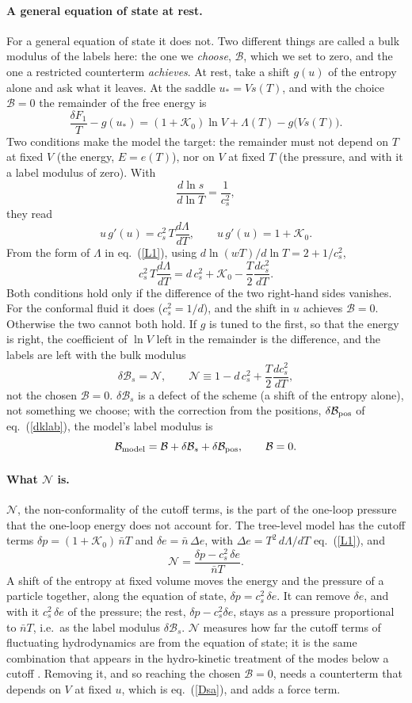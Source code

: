\documentclass[11pt,aps,preprint,nofootinbib,superscriptaddress,tightenlines]{revtex4-2}
\newcommand{\klab}{\mathcal B}
\def\st{\begin{equation}}
\def\stp{\end{equation}}
\def\Eq#1{eq.~(\ref{#1})}
\let\oldparagraph\paragraph
\renewcommand{\paragraph}{\par\bigskip\oldparagraph}
\begin{document}
\paragraph{A general equation of state at rest.}  For a general equation of state it does not.  Two different things are called a bulk modulus of the labels here:
the one we \emph{choose}, $\klab$, which we set to zero, and the one a restricted counterterm \emph{achieves}.  At rest, take a shift $g(u)$ of the entropy alone and ask
what it leaves.  At the saddle $u_*=V s(T)$, and with the choice $\klab=0$ the remainder of the free energy is
\st
\frac{\delta F_1}T-g(u_*)=(1+\mathcal K_0)\ln V+\Lambda(T)-g\big(Vs(T)\big) .
\stp
Two conditions make the model the target: the remainder must not depend on $T$ at fixed $V$ (the energy, $E=e(T)$), nor on $V$ at fixed $T$ (the pressure, and with it
a label modulus of zero).  With
\st
\frac{d\ln s}{d\ln T}=\frac1{c_s^2},
\stp
they read
\st
u\,g'(u)=c_s^2\,T\frac{d\Lambda}{dT},\qquad u\,g'(u)=1+\mathcal K_0 .
\stp
From the form of $\Lambda$ in \Eq{L1}, using $d\ln(wT)/d\ln T=2+1/c_s^2$,
\st
c_s^2\,T\frac{d\Lambda}{dT}=d\,c_s^2+\mathcal K_0-\frac T2\frac{dc_s^2}{dT} .
\stp
Both conditions hold only if the difference of the two right-hand sides vanishes.  For the conformal fluid it does ($c_s^2=1/d$), and the shift in $u$ achieves
$\klab=0$.  Otherwise the two cannot both hold.  If $g$ is tuned to the first, so that the energy is right, the coefficient of $\ln V$ left in the remainder is the
difference, and the labels are left with the bulk modulus
\st
\delta\klab_s=\mathcal N,\qquad \mathcal N\equiv1-d\,c_s^2+\frac T2\frac{dc_s^2}{dT} ,
\label{amtbracket}
\stp
not the chosen $\klab=0$.  $\delta\klab_s$ is a defect of the scheme (a shift of the entropy alone), not something we choose; with the correction from the positions,
$\delta\klab_{\rm pos}$ of \Eq{dklab}, the model's label modulus is
\st
\klab_{\rm model}=\klab+\delta\klab_s+\delta\klab_{\rm pos},\qquad \klab=0 .
\stp

\paragraph{What $\mathcal N$ is.}  $\mathcal N$, the non-conformality of the cutoff terms, is the part of the one-loop pressure that the one-loop energy does not account
for.  The tree-level model has the cutoff terms $\delta p=(1+\mathcal K_0)\,\bar nT$ and $\delta e=\bar n\,\Delta e$, with $\Delta e=T^2\,d\Lambda/dT$ \Eq{L1}, and
\st
\mathcal N=\frac{\delta p-c_s^2\,\delta e}{\bar nT} .
\stp
A shift of the entropy at fixed volume moves the energy and the pressure of a particle together, along the equation of state, $\delta p=c_s^2\,\delta e$.  It can
remove $\delta e$, and with it $c_s^2\,\delta e$ of the pressure; the rest, $\delta p-c_s^2\delta e$, stays as a pressure proportional to $\bar nT$, i.e.\ as the label
modulus $\delta\klab_s$.  $\mathcal N$ measures how far the cutoff terms of fluctuating hydrodynamics are from the equation of state; it is the same
combination that appears in the hydro-kinetic treatment of the modes below a cutoff \cite{amt}.  Removing it, and so reaching the chosen $\klab=0$, needs a counterterm that depends on $V$ at fixed $u$, which is \Eq{Dsa}, and adds a force term.
\end{document}
